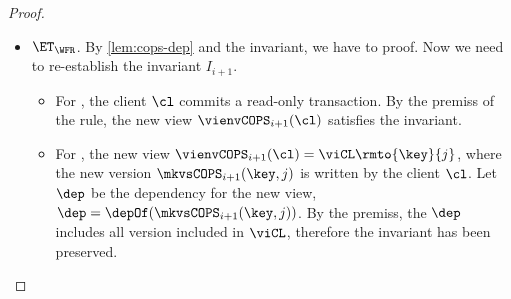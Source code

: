 \begin{proof}
\begin{itemize}
        \item \( \ET_\WFR \).
            By \cref{lem:cops-dep} and the invariant, we have to proof.
            Now we need to re-establish the invariant \( I_{i+1} \).
            \begin{itemize}
                \item 
                For , the client \( \cl \) commits a read-only transaction.
                By the premiss of the rule, the new view \( \vienvCOPS_{i+1}(\cl) \) satisfies the invariant.
                \item For , the new view \( \vienvCOPS_{i+1}(\cl) = \viCL\rmto{\key}{j} \),
                where the new version \( \mkvsCOPS_{i+1}(\key,j)\) is written by the client \( \cl \).
                Let \( \dep \) be the dependency for the new view, \ie \( \dep = \depOf(\mkvsCOPS_{i+1}(\key,j)) \).
                By the premiss, the \( \dep \) includes all version included in \( \viCL \), 
                therefore the invariant has been preserved.
            \end{itemize}
    \end{itemize}
\end{proof}

